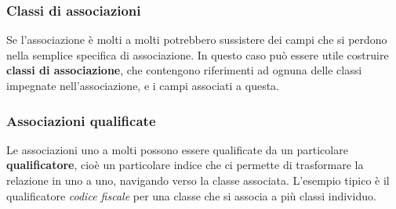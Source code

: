 \documentclass[a4paper,11pt]{article}
\begin{document}
\subsubsection{Classi di associazioni}
Se l'associazione è molti a molti potrebbero sussistere dei campi che si perdono nella semplice specifica di associazione.
In questo caso può essere utile costruire \textbf{classi di associazione}, che contengono riferimenti ad ognuna delle classi impegnate nell'associazione, e i campi associati a questa.

\subsubsection{Associazioni qualificate}
Le associazioni uno a molti possono essere qualificate da un particolare \textbf{qualificatore}, cioè un particolare indice che ci permette di trasformare la relazione in uno a uno, navigando verso la classe associata.
L'esempio tipico è il qualificatore \textit{codice fiscale} per una classe che si associa a più classi individuo.  
\end{document}
